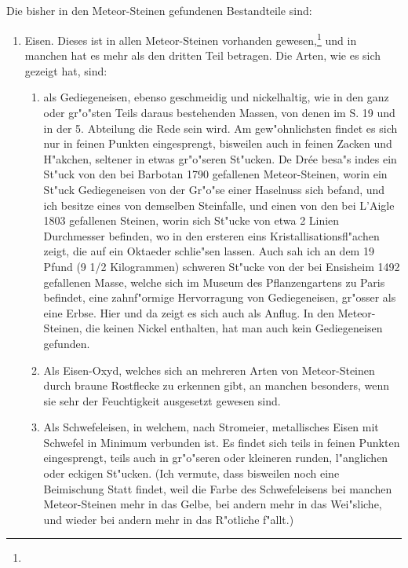 \documentclass[a4paper, 11pt, oneside, polutonikogreek, german]{article}
\begin{document}
\subsection{}
\paragraph{}
Die bisher in den Meteor-Steinen gefundenen Bestandteile sind:
\begin{enumerate}
   \item Eisen. Dieses ist in allen Meteor-Steinen vorhanden gewesen,\footnote{} und in manchen hat es mehr als den dritten Teil betragen. Die Arten, wie es sich gezeigt hat, sind:
   \begin{enumerate}
     \item als Gediegeneisen, ebenso geschmeidig und nickelhaltig, wie in den ganz oder gr"o"sten Teils daraus bestehenden Massen, von denen im S. 19 und in der 5. Abteilung die Rede sein wird. Am gew"ohnlichsten findet es sich nur in feinen Punkten eingesprengt, bisweilen auch in feinen Zacken und H"akchen, seltener in etwas gr"o"seren St"ucken. De Drée besa"s indes ein St"uck von den bei Barbotan 1790 gefallenen Meteor-Steinen, worin ein St"uck Gediegeneisen von der Gr"o"se einer Haselnuss sich befand, und ich besitze eines von demselben Steinfalle, und einen von den bei L'Aigle 1803 gefallenen Steinen, worin sich St"ucke von etwa 2 Linien Durchmesser befinden, wo in den ersteren eins Kristallisationsfl"achen zeigt, die auf ein Oktaeder schlie"sen lassen. Auch sah ich an dem 19 Pfund (9 1/2 Kilogrammen) schweren St"ucke von der bei Ensisheim 1492 gefallenen Masse, welche sich im Museum des Pflanzengartens zu Paris befindet, eine zahnf"ormige Hervorragung von Gediegeneisen, gr"osser als eine Erbse. Hier und da zeigt es sich auch als Anflug. In den Meteor-Steinen, die keinen Nickel enthalten, hat man auch kein Gediegeneisen gefunden.
     \item Als Eisen-Oxyd, welches sich an mehreren Arten von Meteor-Steinen durch braune Rostflecke zu erkennen gibt, an manchen besonders, wenn sie sehr der Feuchtigkeit ausgesetzt gewesen sind.
     \item Als Schwefeleisen, in welchem, nach Stromeier, metallisches Eisen mit Schwefel in Minimum verbunden ist. Es findet sich teils in feinen Punkten eingesprengt, teils auch in gr"o"seren oder kleineren runden, l"anglichen oder eckigen St"ucken. (Ich vermute, dass bisweilen noch eine Beimischung Statt findet, weil die Farbe des Schwefeleisens bei manchen Meteor-Steinen mehr in das Gelbe, bei andern mehr in das Wei"sliche, und wieder bei andern mehr in das R"otliche f"allt.)

\end{enumerate}
\end{enumerate}
\end{document}
